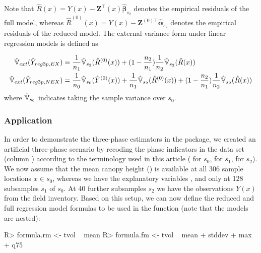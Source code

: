 Note that $\hat{R}(x)=Y(x)-\pmb{Z}^{\top}(x)\hat{\pmb{\beta}}_{s_2}$ denotes the empirical residuals of the full model, whereas $\hat{R}^{(0)}(x)=Y(x)-\pmb{Z}^{(0)\top}\hat{\pmb{\alpha}}_{s_2}$ denotes the empirical residuals of the reduced model. The external variance form under linear regression models is defined as

\begin{subequations}\label{eq:extvar_reg3p}
\begin{align}
\hat{\mathbb{V}}_{ext}(\hat{Y}_{reg3p,EX})&=\frac{1}{n_1}\hat{\mathbb{V}}_{s_2}(\hat{R}^{(0)}(x)) + (1-\frac{n_2}{n_1})\frac{1}{n_2}\hat{\mathbb{V}}_{s_2}(\hat{R}(x))\label{eq:extvar_reg3p_ex} \\
\hat{\mathbb{V}}_{ext}(\hat{Y}_{reg3p,NEX})&=\frac{1}{n_0}\hat{\mathbb{V}}_{s_0}(\hat{Y}^{(0)}(x))
+\frac{1}{n_1}\hat{\mathbb{V}}_{s_2}(\hat{R}^{(0)}(x)) + (1-\frac{n_2}{n_1})\frac{1}{n_2}\hat{\mathbb{V}}_{s_2}(\hat{R}(x)) \label{eq:extvar_reg3p_nex}
\end{align}
\end{subequations}
where $\hat{\mathbb{V}}_{s_0}$ indicates taking the sample variance over $s_0$.


\subsubsection{Application}

In order to demonstrate the three-phase estimators in the package, we created an artificial three-phase scenario by recoding the phase indicators in the  data set (column ) according to the terminology used in this article ( for $s_0$,  for $s_1$,  for $s_2$). We now assume that the mean canopy height () is available at all 306 sample locations $x \in s_0$, whereas we have the explanatory variables ,  and  only at 128 subsamples $s_1$ of $s_0$. At 40 further subsamples $s_2$ we have the observations $Y(x)$ from the field inventory. Based on this setup, we can now define the reduced and full regression model formulas to be used in the  function (note that the models are nested):

\begin{small}
\begin{Schunk}
\begin{Sinput}
R> formula.rm <- tvol ~ mean
R> formula.fm <- tvol ~ mean + stddev + max + q75
\end{Sinput}
\end{Schunk}
\end{small}

